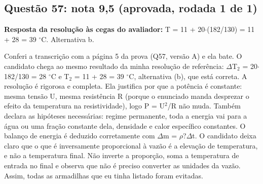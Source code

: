 \documentclass{article}%
\begin{document}
\subsection*{Questão 57: nota 9,5 (aprovada, rodada 1 de 1)}%
\textbf{Resposta da resolução às cegas do avaliador:} T = 11 + 20$\cdot$(182/130) = 11 + 28 = 39 $^\circ$C. Alternativa b.\par %
Conferi a transcrição com a página 5 da prova (Q57, versão A) e ela bate. O candidato chega ao mesmo resultado da minha resolução de referência: $\Delta$T$_{2}$ = 20$\cdot$182/130 = 28 $^\circ$C e T$_{2}$ = 11 + 28 = 39 $^\circ$C, alternativa (b), que está correta.\newline%
\newline%
A resolução é rigorosa e completa. Ela justifica por que a potência é constante: mesma tensão U, mesma resistência R (porque o enunciado manda desprezar o efeito da temperatura na resistividade), logo P = U$^2$/R não muda. Também declara as hipóteses necessárias: regime permanente, toda a energia vai para a água ou uma fração constante dela, densidade e calor específico constantes. O balanço de energia é deduzido corretamente com $\Delta$m = $\rho$?$\Delta$t.\newline%
\newline%
O candidato deixa claro que o que é inversamente proporcional à vazão é a elevação de temperatura, e não a temperatura final. Não inverte a proporção, soma a temperatura de entrada no final e observa que não é preciso converter as unidades da vazão. Assim, todas as armadilhas que eu tinha listado foram evitadas.\newline%
\newline%
\end{document}

